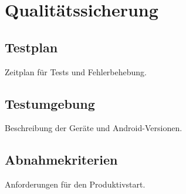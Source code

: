 \section{Qualitätssicherung}
\subsection{Testplan}
Zeitplan für Tests und Fehlerbehebung.

\subsection{Testumgebung}
Beschreibung der Geräte und Android-Versionen.

\subsection{Abnahmekriterien}
Anforderungen für den Produktivstart.